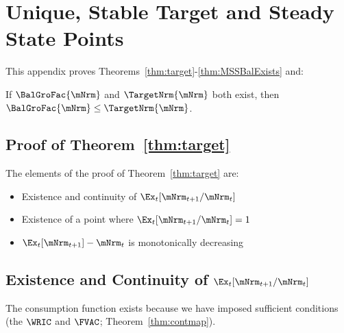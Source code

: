 \documentclass[\econtexRoot/BufferStockTheory]{subfiles}
\begin{document}

\hypertarget{ApndxMTargetIsStable}{}
\section{Unique, Stable Target and Steady State Points}\label{sec:ApndxMTargetIsStable}


This appendix proves Theorems~\ref{thm:target}-\ref{thm:MSSBalExists} and:
\onlyinsubfile{\setcounter{theorem}{1}}

  \begin{lemma}\label{lemma:orderingPartOne}
  If $\BalGroFac{\mNrm}$ and $\TargetNrm{\mNrm}$ both exist, then $\BalGroFac{\mNrm} \leq \TargetNrm{\mNrm}$.
  \end{lemma}

  \begin{comment}
  \begin{lemma}\label{lemma:orderingPartTwo}
  If $\BalGroFac{\mNrm}$ and $\BalGroRte{\mNrm}$ both exist, then $\BalGroFac{\mNrm} \leq \BalGroRte{\mNrm}$.
  \end{lemma}
\end{comment}

  \subsection{Proof of Theorem~\ref{thm:target}}
  
  The elements of the proof of Theorem~\ref{thm:target} are:
\begin{itemize}
\item Existence and continuity of $\Ex_t [{\mNrm}_{t+1}/\mNrm_t]$
\item Existence of a point where $\Ex_t [{\mNrm}_{t+1}/\mNrm_t] = 1$
\item $\Ex_t [{\mNrm}_{t+1}]-\mNrm_{t}$ is monotonically decreasing
\end{itemize}


\subsection{Existence and Continuity of
  \texorpdfstring{$\Ex_t [{\mNrm}_{t+1}/\mNrm_t]$}{Ex-{t}[mNrm-{t+1}/mNrm-{t}]}}\label{subsubsec:RatExitsCont}
The consumption function exists because we have imposed sufficient conditions (the $\WRIC$ and $\FVAC$; Theorem~\ref{thm:contmap}). %
\end{document}
